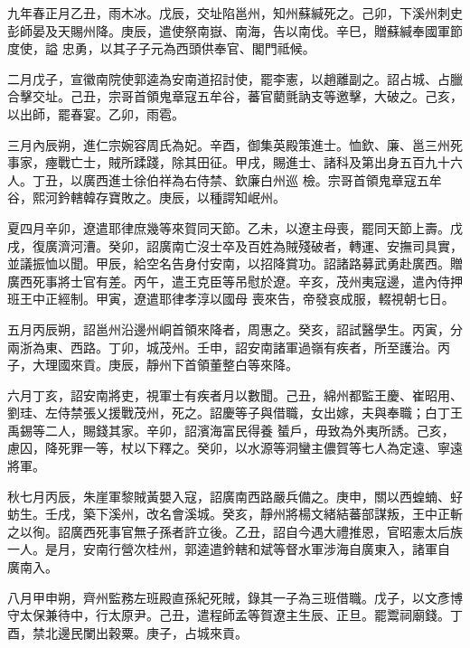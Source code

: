 \begin{pinyinscope}
 九年春正月乙丑，雨木冰。戊辰，交址陷邕州，知州蘇緘死之。己卯，下溪州刺史彭師晏及天賜州降。庚辰，遣使祭南嶽、南海，告以南伐。辛巳，贈蘇緘奉國軍節度使，謚
 忠勇，以其子子元為西頭供奉官、閣門祗候。



 二月戊子，宣徽南院使郭逵為安南道招討使，罷李憲，以趙離副之。詔占城、占臘合擊交址。己丑，宗哥首領鬼章寇五牟谷，蕃官藺氈訥支等邀擊，大破之。己亥，以出師，罷春宴。乙卯，雨雹。



 三月內辰朔，進仁宗婉容周氏為妃。辛酉，御集英殿策進士。恤欽、廉、邕三州死事家，瘞戰亡士，賊所蹂踐，除其田征。甲戌，賜進士、諸科及第出身五百九十六人。丁丑，以廣西進士徐伯祥為右侍禁、欽廉白州巡
 檢。宗哥首領鬼章寇五牟谷，熙河鈐轄韓存寶敗之。庚辰，以種諤知岷州。



 夏四月辛卯，遼遣耶律庶幾等來賀同天節。乙未，以遼主母喪，罷同天節上壽。戊戌，復廣濟河漕。癸卯，詔廣南亡沒士卒及百姓為賊殘破者，轉運、安撫司具實，並議振恤以聞。甲辰，給空名告身付安南，以招降賞功。詔諸路募武勇赴廣西。贈廣西死事將士官有差。丙午，遣王克臣等吊慰於遼。辛亥，茂州夷寇邊，遣內侍押班王中正經制。甲寅，遼遣耶律孝淳以國母
 喪來告，帝發哀成服，輟視朝七日。



 五月丙辰朔，詔邕州沿邊州峒首領來降者，周惠之。癸亥，詔試醫學生。丙寅，分兩浙為東、西路。丁卯，城茂州。壬申，詔安南諸軍過嶺有疾者，所至護治。丙子，大理國來貢。庚辰，靜州下首領董整白等來降。



 六月丁亥，詔安南將吏，視軍士有疾者月以數聞。己丑，綿州都監王慶、崔昭用、劉珪、左侍禁張乂援戰茂州，死之。詔慶等子與借職，女出嫁，夫與奉職；白丁王禹錫等二人，賜錢其家。辛卯，詔濱海富民得養
 蜑戶，毋致為外夷所誘。己亥，慮囚，降死罪一等，杖以下釋之。癸卯，以水源等洞蠻主儂賀等七人為定遠、寧遠將軍。



 秋七月丙辰，朱崖軍黎賊黃嬰入寇，詔廣南西路嚴兵備之。庚申，關以西蝗蝻、虸蚄生。壬戌，築下溪州，改名會溪城。癸亥，靜州將楊文緒結蕃部謀叛，王中正斬之以徇。詔廣西死事官無子孫者許立後。乙丑，詔自今遇大禮推恩，官昭憲太后族一人。是月，安南行營次桂州，郭逵遣鈐轄和斌等督水軍涉海自廣東入，諸軍自
 廣南入。



 八月甲申朔，齊州監務左班殿直孫紀死賊，錄其一子為三班借職。戊子，以文彥博守太保兼待中，行太原尹。己丑，遣程師孟等賀遼主生辰、正旦。罷鬻祠廟錢。丁酉，禁北邊民闌出穀粟。庚子，占城來貢。




\end{pinyinscope}
